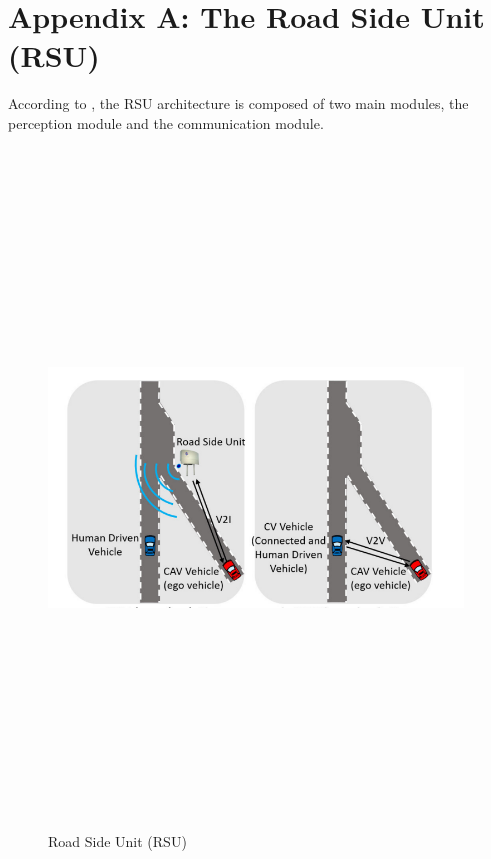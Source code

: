 \appendix 
\thispagestyle{empty}

\hypertarget{AppendixA}{}\section*{Appendix A: The Road Side Unit (RSU)} \label{sec:RSU}
According to \cite{kherroubi2020novel}, the RSU architecture is composed of two main modules, the perception module and the communication module. 
        \begin{figure}[!h]
        \centering 
        \includegraphics[width=11cm,height=18cm,keepaspectratio]{chapters/Chapitre_4/Figures/RSU}
        \vspace{-2.3mm}
        \caption{Road Side Unit (RSU)}
        \label{fig:RSU}
        \vspace{-5mm}
        \end{figure}


